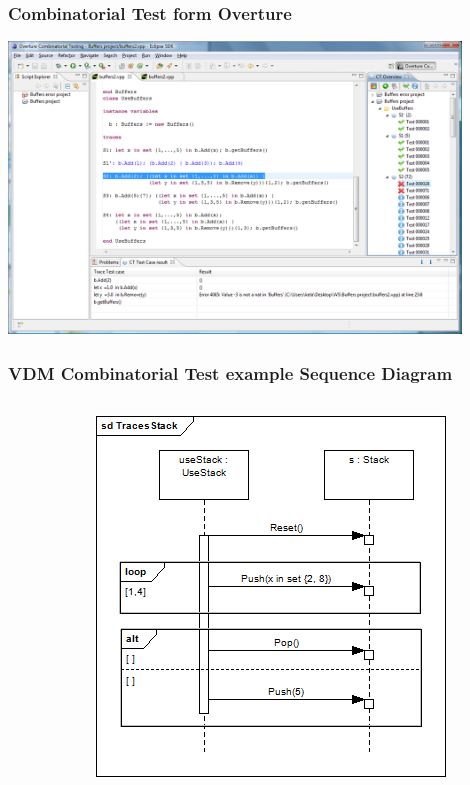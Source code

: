 \frame
{
  \frametitle{Combinatorial Test form Overture}
	\begin{center}
	\includegraphics[width=0.9\textwidth]{images/CTOverview.png}%
	\end{center}
}

%
%
\frame
{
  \frametitle{VDM Combinatorial Test example Sequence Diagram}
  
\begin{columns}
\begin{column}[l]{5cm}

	\begin{center}
	\end{center}

\end{column}
\begin{column}[r]{5cm}
	
	\begin{center}
	\includegraphics[width=\textwidth]{images/TracesSequenceDiagramEx2.png}%
	\end{center}

\end{column}
\end{columns}
  

}

